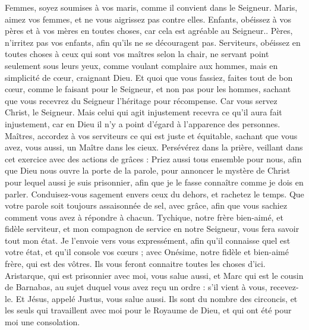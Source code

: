\begin{multicols}{2}
Femmes, soyez soumises à vos maris, comme il convient dans le Seigneur.
Maris, aimez vos femmes, et ne vous aigrissez pas contre elles.
Enfants, obéissez à vos pères et à vos mères en toutes choses, car cela est agréable au Seigneur..
Pères, n'irritez pas vos enfants, afin qu'ils ne se découragent pas.
Serviteurs, obéissez en toutes choses à ceux qui sont vos maîtres selon la chair, ne servant point seulement sous leurs yeux, comme voulant complaire aux hommes, mais en simplicité de cœur, craignant Dieu.
Et quoi que vous fassiez, faites tout de bon cœur, comme le faisant pour le Seigneur, et non pas pour les hommes,
sachant que vous recevrez du Seigneur l'héritage pour récompense. Car vous servez Christ, le Seigneur.
Mais celui qui agit injustement recevra ce qu'il aura fait injustement, car en Dieu il n'y a point d'égard à l'apparence des personnes.
\VerseOne{}Maîtres, accordez à vos serviteurs ce qui est juste et équitable, sachant que vous avez, vous aussi, un Maître dans les cieux.
Persévérez dans la prière, veillant dans cet exercice avec des actions de grâces :
Priez aussi tous ensemble pour nous, afin que Dieu nous ouvre la porte de la parole, pour annoncer le mystère de Christ pour lequel aussi je suis prisonnier, 
afin que je le fasse connaître comme je dois en parler.
Conduisez-vous sagement envers ceux du dehors, et rachetez le temps.
Que votre parole soit toujours assaisonnée de sel, avec grâce, afin que vous sachiez comment vous avez à répondre à chacun.
Tychique, notre frère bien-aimé, et fidèle serviteur, et mon compagnon de service en notre Seigneur, vous fera savoir tout mon état.
Je l'envoie vers vous expressément, afin qu'il connaisse quel est votre état, et qu'il console vos cœurs ;
avec Onésime, notre fidèle et bien-aimé frère, qui est des vôtres. Ils vous feront connaitre toutes les choses d'ici.
Aristarque, qui est prisonnier avec moi, vous salue aussi, et Marc qui est le cousin de Barnabas, au sujet duquel vous avez reçu un ordre : s'il vient à vous, recevez-le.
Et Jésus, appelé Justus, vous salue aussi. Ils sont du nombre des circoncis, et les seuls qui travaillent avec moi pour le Royaume de Dieu, et qui ont été pour moi une consolation.

\end{multicols}
